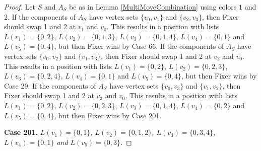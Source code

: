 \documentclass[12pt]{amsart}
\theoremstyle{plain}
\theoremstyle{definition}
\theoremstyle{remark}
\begin{document}
\begin{proof}
Let $S$ and $A_S$ be as in Lemma \ref{MultiMoveCombination} using colors $1$ and $2$. If the components of $A_S$ have vertex sets $\{v_0, v_1\}$ and $\{v_2, v_3\}$, then Fixer should swap 1 and 2 at $v_1$ and $v_0$. This results in a position with lists $L(v_1) = \{0, 2\}$, $L(v_2) = \{0, 1, 3\}$, $L(v_3) = \{0, 1, 4\}$, $L(v_4) = \{0, 1\}$ and $L(v_5) = \{0, 4\}$, but then Fixer wins by Case 66.
If the components of $A_S$ have vertex sets $\{v_0, v_2\}$ and $\{v_1, v_3\}$, then Fixer should swap 1 and 2 at $v_2$ and $v_0$. This results in a position with lists $L(v_1) = \{0, 2\}$, $L(v_2) = \{0, 2, 3\}$, $L(v_3) = \{0, 2, 4\}$, $L(v_4) = \{0, 1\}$ and $L(v_5) = \{0, 4\}$, but then Fixer wins by Case 29.
If the components of $A_S$ have vertex sets $\{v_0, v_3\}$ and $\{v_1, v_2\}$, then Fixer should swap 1 and 2 at $v_3$ and $v_0$. This results in a position with lists $L(v_1) = \{0, 2\}$, $L(v_2) = \{0, 2, 3\}$, $L(v_3) = \{0, 1, 4\}$, $L(v_4) = \{0, 2\}$ and $L(v_5) = \{0, 4\}$, but then Fixer wins by Case 201.

\noindent\textbf{Case 201.  }\textit{$L(v_1) = \{0, 1\}$, $L(v_2) = \{0, 1, 2\}$, $L(v_3) = \{0, 3, 4\}$, $L(v_4) = \{0, 1\}$ and $L(v_5) = \{0, 3\}$.}


\end{proof}
\end{document}
